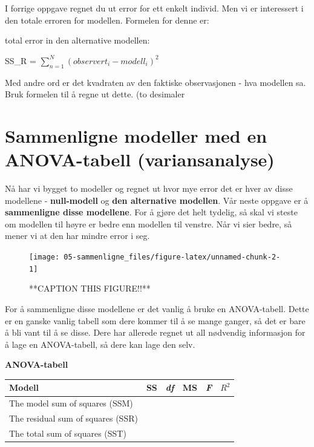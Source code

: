 \documentclass[
]{book}
\begin{document}
I forrige oppgave regnet du ut error for ett enkelt individ. Men vi er interessert i den totale erroren for modellen. Formelen for denne er:

total error in den alternative modellen:

SS\_R = \(\sum_{n=1}^N (observert_i - modell_i)^2\)

Med andre ord er det kvadraten av den faktiske observasjonen - hva modellen sa. Bruk formelen til å regne ut dette. (to desimaler

\hypertarget{sammenligne-modeller-med-en-anova-tabell-variansanalyse}{%
\chapter{Sammenligne modeller med en ANOVA-tabell (variansanalyse)}\label{sammenligne-modeller-med-en-anova-tabell-variansanalyse}}

Nå har vi bygget to modeller og regnet ut hvor mye error det er hver av disse modellene - \textbf{null-modell} og \textbf{den alternative modellen}. Vår neste oppgave er å \textbf{sammenligne disse modellene}. For å gjøre det helt tydelig, så skal vi steste om modellen til høyre er bedre enn modellen til venstre. Når vi sier bedre, så mener vi at den har mindre error i seg.

\begin{figure}

{\centering \texttt{[image: 05-sammenligne\_files/figure-latex/unnamed-chunk-2-1]} 

}

\caption{**CAPTION THIS FIGURE!!**}\label{fig:unnamed-chunk-2}
\end{figure}

For å sammenligne disse modellene er det vanlig å bruke en ANOVA-tabell. Dette er en ganske vanlig tabell som dere kommer til å se mange ganger, så det er bare å bli vant til å se disse. Dere har allerede regnet ut all nødvendig informasjon for å lage en ANOVA-tabell, så dere kan lage den selv.

\textbf{ANOVA-tabell}

\begin{longtable}[]{@{}llllll@{}}
\toprule
Modell & SS & \emph{df} & MS & \emph{F} & \(R^2\)\tabularnewline
\midrule
\endhead
The model sum of squares (SSM) & & & & &\tabularnewline
The residual sum of squares (SSR) & & & & &\tabularnewline
The total sum of squares (SST) & & & & &\tabularnewline
\bottomrule
\end{longtable}
\end{document}
